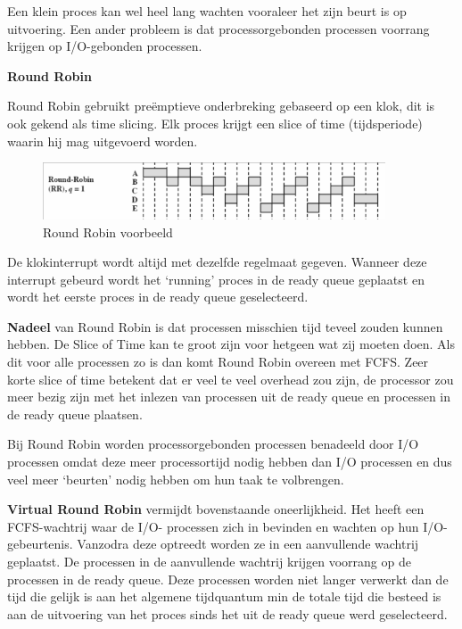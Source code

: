 Een klein proces kan wel heel lang wachten vooraleer het zijn beurt is op uitvoering. Een ander probleem is dat processorgebonden processen voorrang krijgen op I/O-gebonden processen.

\textbf{Round Robin}

Round Robin gebruikt preëmptieve onderbreking gebaseerd op een klok, dit is ook gekend als time slicing. Elk proces krijgt een slice of time (tijdsperiode) waarin hij mag uitgevoerd worden.


\begin{figure}[htp]
    \centering
            \includegraphics[width=4in]{img/roundrobin.png}
        \caption{Round Robin voorbeeld}
    \label{fig:Round Robin voorbeeld}
\end{figure}

De klokinterrupt wordt altijd met dezelfde regelmaat gegeven. Wanneer deze interrupt gebeurd wordt het ‘running’ proces in de ready queue geplaatst en wordt het eerste proces in de ready queue geselecteerd.

\textbf{Nadeel} van Round Robin is dat processen misschien tijd teveel zouden kunnen hebben. De Slice of Time kan te groot zijn voor hetgeen wat zij moeten doen. Als dit voor alle processen zo is dan komt Round Robin overeen met FCFS. Zeer korte slice of time betekent dat er veel te veel overhead zou zijn, de processor zou meer bezig zijn met het inlezen van processen uit de ready queue en processen in de ready queue plaatsen.

Bij Round Robin worden processorgebonden processen benadeeld door I/O processen omdat deze meer processortijd nodig hebben dan I/O processen en dus veel meer ‘beurten’ nodig hebben om hun taak te volbrengen.

\textbf{Virtual Round Robin} vermijdt bovenstaande oneerlijkheid. Het heeft een FCFS-wachtrij waar de I/O- processen zich in bevinden en wachten op hun I/O-gebeurtenis. Vanzodra deze optreedt worden ze in een aanvullende wachtrij geplaatst. De processen in de aanvullende wachtrij krijgen voorrang op de processen in de ready queue. Deze processen worden niet langer verwerkt dan de tijd die gelijk is aan het algemene tijdquantum min de totale tijd die besteed is aan de uitvoering van het proces sinds het uit de ready queue werd geselecteerd.



